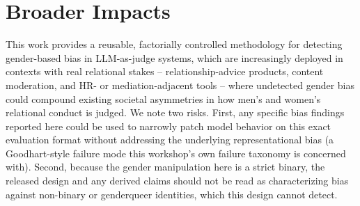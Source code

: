 \section{Broader Impacts}
\label{sec:impacts}

This work provides a reusable, factorially controlled methodology for
detecting gender-based bias in LLM-as-judge systems, which are increasingly
deployed in contexts with real relational stakes -- relationship-advice
products, content moderation, and HR- or mediation-adjacent tools -- where
undetected gender bias could compound existing societal asymmetries in how
men's and women's relational conduct is judged. We note two risks. First,
any specific bias findings reported here could be used to narrowly patch
model behavior on this exact evaluation format without addressing the
underlying representational bias (a Goodhart-style failure mode this
workshop's own failure taxonomy is concerned with). Second, because the
gender manipulation here is a strict binary, the released design and any
derived claims should not be read as characterizing bias against non-binary
or genderqueer identities, which this design cannot detect.
